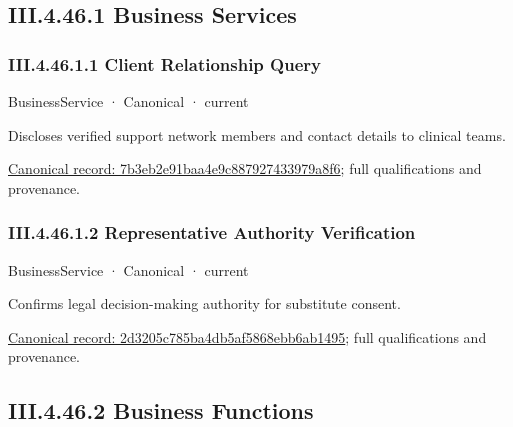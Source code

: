 \subsection*{III.4.46.1 Business Services}
\label{navigation:III.4.46.1}

\subsubsection*{III.4.46.1.1 Client Relationship Query}
\label{navigation:III.4.46.1.1}

\label{element:7b3eb2e91baa4e9c887927433979a8f6}
{\small BusinessService · Canonical · current}\par

Discloses verified support network members and contact details to clinical teams.


{\footnotesize \href{../../../../continuum/business/business-service/7b3eb2e91baa4e9c887927433979a8f6.md}{Canonical record: 7b3eb2e91baa4e9c887927433979a8f6}; full qualifications and provenance.}\par
\subsubsection*{III.4.46.1.2 Representative Authority Verification}
\label{navigation:III.4.46.1.2}

\label{element:2d3205c785ba4db5af5868ebb6ab1495}
{\small BusinessService · Canonical · current}\par

Confirms legal decision-making authority for substitute consent.


{\footnotesize \href{../../../../continuum/business/business-service/2d3205c785ba4db5af5868ebb6ab1495.md}{Canonical record: 2d3205c785ba4db5af5868ebb6ab1495}; full qualifications and provenance.}\par
\subsection*{III.4.46.2 Business Functions}
\label{navigation:III.4.46.2}


